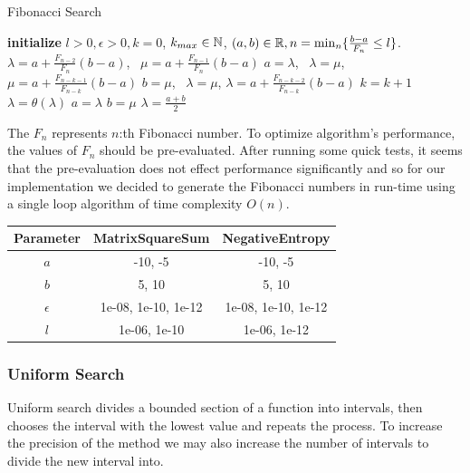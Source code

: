 \documentclass[a4paper,english,titlepage,12pt]{article}
\newcommand{\R}{\ensuremath\mathbb{R}}
\newcommand{\N}{\ensuremath\mathbb{N}}
\begin{document}
\begin{algorithm}[H]
\caption{Fibonacci Search}
\label{alg_fibonacci}
\begin{algorithmic}[1]
\STATE \textbf{initialize} $l > 0, \epsilon > 0, k = 0$, $k_{max} \in \N$, $(a, b) \in \R, n = \mathrm{min}_n \{ \frac{b - a}{F_n} \leq l \}$.
\STATE $\lambda = a + \frac{F_{n-2}}{F_n} (b - a)$, \  $\mu = a + \frac{F_{n-1}}{F_n} (b - a)$
    \IF{$\theta(\lambda) < \theta(\mu)$}
        \STATE $a = \lambda$, \ $\lambda = \mu$, $\mu = a + \frac{F_{n-k-1}}{F_{n-k}} (b - a)$
    \ELSE
        \STATE $b = \mu$, \ $\lambda = \mu$, $\lambda = a + \frac{F_{n-k-2}}{F_{n-k}} (b - a)$
    \ENDIF
    \STATE $k = k + 1$
\ENDWHILE
\STATE $\lambda = \theta(\lambda)$
\IF{$\theta(\lambda) > \theta(\mu + \epsilon)$}
    \STATE $a = \lambda$
\ELSE
    \STATE $b = \mu$
\ENDIF
\RETURN $\lambda = \frac{a + b}{2}$
\end{algorithmic}
\end{algorithm}

The $F_n$ represents $n$:th Fibonacci number. To optimize algorithm's performance, the values of $F_n$ should be pre-evaluated. After running some quick tests, it seems that the pre-evaluation does not effect performance significantly and so for our implementation we decided to generate the Fibonacci numbers in run-time using a single loop algorithm of time complexity $O(n)$. 

\begin{table}[H]
\label{tab:params_FibonacciSearch}
\centering
{}
\begin{tabular}{|c|c|c|}
\hline
\rowcolor{gray!25}
Parameter & MatrixSquareSum & NegativeEntropy \\
\hline
$a$ & -10, -5 & -10, -5 \\
$b$ & 5, 10 & 5, 10 \\
$\epsilon$ & 1e-08, 1e-10, 1e-12 & 1e-08, 1e-10, 1e-12 \\
$l$ & 1e-06, 1e-10 & 1e-06, 1e-12 \\
\hline
\end{tabular}
\end{table}


\subsubsection{Uniform Search}

Uniform search divides a bounded section of a function into intervals, then chooses the interval with the lowest value and repeats the process. To increase the precision of the method we may also increase the number of intervals to divide the new interval into. \cite{book:nonlinear_programming}
\end{document}
